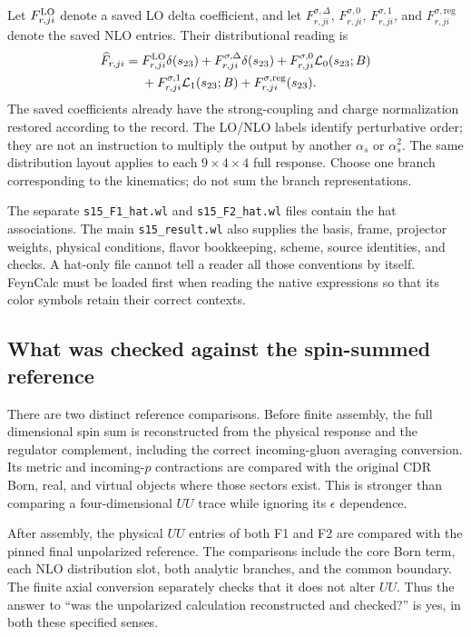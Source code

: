 \documentclass[11pt,a4paper]{article}
\newcommand{\as}{\alpha_s}
\newcommand{\eps}{\epsilon}
\newcommand{\code}[1]{{\small\nolinkurl{#1}}}
\begin{document}
Let $F^{\rm LO}_{r,ji}$ denote a saved LO delta coefficient, and let $F^{\sigma,\Delta}_{r,ji}$, $F^{\sigma,0}_{r,ji}$, $F^{\sigma,1}_{r,ji}$, and $F^{\sigma,\mathrm{reg}}_{r,ji}$ denote the saved NLO entries. Their distributional reading is
\begin{align}
 \widehat F_{r,ji}={}&F^{\rm LO}_{r,ji}\delta(s_{23})
 +F^{\sigma,\Delta}_{r,ji}\delta(s_{23})
 +F^{\sigma,0}_{r,ji}\mathcal L_0(s_{23};B)\nonumber\\
 &+F^{\sigma,1}_{r,ji}\mathcal L_1(s_{23};B)
 +F^{\sigma,\mathrm{reg}}_{r,ji}(s_{23}).
\end{align}
The saved coefficients already have the strong-coupling and charge normalization restored according to the record. The LO/NLO labels identify perturbative order; they are not an instruction to multiply the output by another $\as$ or $\as^2$. The same distribution layout applies to each $9\times4\times4$ full response. Choose one branch corresponding to the kinematics; do not sum the branch representations.

The separate \code{s15_F1_hat.wl} and \code{s15_F2_hat.wl} files contain the hat associations. The main \code{s15_result.wl} also supplies the basis, frame, projector weights, physical conditions, flavor bookkeeping, scheme, source identities, and checks. A hat-only file cannot tell a reader all those conventions by itself. FeynCalc must be loaded first when reading the native expressions so that its color symbols retain their correct contexts.

\subsection{What was checked against the spin-summed reference}
There are two distinct reference comparisons. Before finite assembly, the full dimensional spin sum is reconstructed from the physical response and the regulator complement, including the correct incoming-gluon averaging conversion. Its metric and incoming-$p$ contractions are compared with the original CDR Born, real, and virtual objects where those sectors exist. This is stronger than comparing a four-dimensional $UU$ trace while ignoring its $\eps$ dependence.

After assembly, the physical $UU$ entries of both F1 and F2 are compared with the pinned final unpolarized reference. The comparisons include the core Born term, each NLO distribution slot, both analytic branches, and the common boundary. The finite axial conversion separately checks that it does not alter $UU$. Thus the answer to ``was the unpolarized calculation reconstructed and checked?'' is yes, in both these specified senses.
\end{document}
